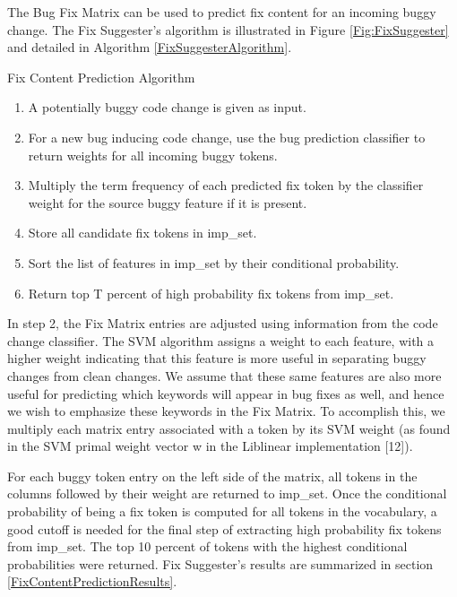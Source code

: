 \documentclass[conference]{IEEEtran}
\begin{document}
The Bug Fix Matrix can be used to predict fix content for an incoming buggy change. The Fix Suggester's algorithm is illustrated in Figure \ref{Fig:FixSuggester} and detailed in Algorithm \ref{FixSuggesterAlgorithm}.
\begin{algorithm}
\caption{Fix Content Prediction Algorithm}

\begin{enumerate}
\item A potentially buggy code change is given as input.
\item For a new bug inducing code change, use the bug prediction classifier to return weights for all incoming buggy tokens.
\item Multiply the term frequency of each predicted fix token by the classifier weight for the source buggy feature if it is present.
\item Store all candidate fix tokens in imp\_set.
\item Sort the list of features in imp\_set by their conditional probability.
\item Return top T percent of high probability fix tokens from imp\_set.
\end{enumerate}
\label{FixSuggesterAlgorithm}
\end{algorithm}

In step 2, the Fix Matrix entries are adjusted using information from the code change classifier.
The SVM algorithm assigns a weight to each feature, with a higher weight indicating that this feature is more useful in separating buggy changes from clean changes.
We assume that these same features are also more useful for predicting which keywords will appear in bug fixes as well, and hence we wish to emphasize these keywords in the Fix Matrix.
To accomplish this, we multiply each matrix entry associated with a token by its SVM weight (as found in the SVM primal weight vector w in the Liblinear implementation [12]).

For each buggy token entry on the left side of the matrix, all tokens in the columns followed by their weight are returned to imp\_set. Once the conditional probability of being a fix token is computed for all tokens in the vocabulary, a good cutoff is needed for the final step of extracting high probability fix tokens from imp\_set. 
The top 10 percent of tokens with the highest conditional probabilities were returned. Fix Suggester's results are summarized in section \ref{FixContentPredictionResults}.
\end{document}
